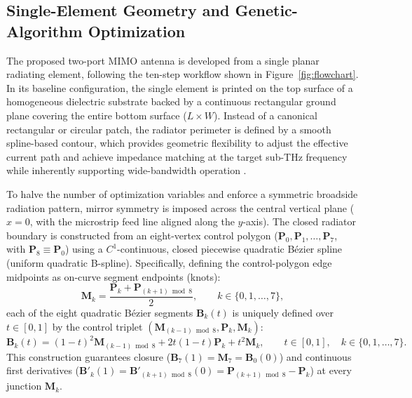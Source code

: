 \documentclass[referee,pdflatex,sn-mathphys-ay]{sn-jnl}
\begin{document}

\subsection{Single-Element Geometry and Genetic-Algorithm Optimization}
\label{subsec:single_element_design}

The proposed two-port MIMO antenna is developed from a single planar radiating element, following the ten-step workflow shown in Figure~\ref{fig:flowchart}. In its baseline configuration, the single element is printed on the top surface of a homogeneous dielectric substrate backed by a continuous rectangular ground plane covering the entire bottom surface ($L \times W$). Instead of a canonical rectangular or circular patch, the radiator perimeter is defined by a smooth spline-based contour, which provides geometric flexibility to adjust the effective current path and achieve impedance matching at the target sub-THz frequency while inherently supporting wide-bandwidth operation \citep{marouf_bezier_2023, Bekasiewicz2021, Prasetyo2023ISAP, Prasetyo2023PIERS}.

To halve the number of optimization variables and enforce a symmetric broadside radiation pattern, mirror symmetry is imposed across the central vertical plane ($x=0$, with the microstrip feed line aligned along the $y$-axis). The closed radiator boundary is constructed from an eight-vertex control polygon ($\mathbf{P}_0, \mathbf{P}_1, \dots, \mathbf{P}_7$, with $\mathbf{P}_8 \equiv \mathbf{P}_0$) using a $C^{1}$-continuous, closed piecewise quadratic B\'ezier spline (uniform quadratic B-spline). Specifically, defining the control-polygon edge midpoints as on-curve segment endpoints (knots):
\begin{equation}
\mathbf{M}_k = \frac{\mathbf{P}_k + \mathbf{P}_{(k+1)\bmod 8}}{2}, \qquad k \in \{0, 1, \dots, 7\},
\label{eq:spline_midpoints}
\end{equation}
each of the eight quadratic B\'ezier segments $\mathbf{B}_k(t)$ is uniquely defined over $t \in [0, 1]$ by the control triplet $(\mathbf{M}_{(k-1)\bmod 8}, \mathbf{P}_k, \mathbf{M}_k)$:
\begin{equation}
\mathbf{B}_k(t) = (1-t)^{2}\mathbf{M}_{(k-1)\bmod 8} + 2t(1-t)\mathbf{P}_k + t^{2}\mathbf{M}_k, \qquad t \in [0, 1], \quad k \in \{0, 1, \dots, 7\}.
\label{eq:bezier_segment}
\end{equation}
This construction guarantees closure ($\mathbf{B}_7(1) = \mathbf{M}_7 = \mathbf{B}_0(0)$) and continuous first derivatives ($\mathbf{B}'_k(1) = \mathbf{B}'_{(k+1)\bmod 8}(0) = \mathbf{P}_{(k+1)\bmod 8} - \mathbf{P}_k$) at every junction $\mathbf{M}_k$.
\end{document}
